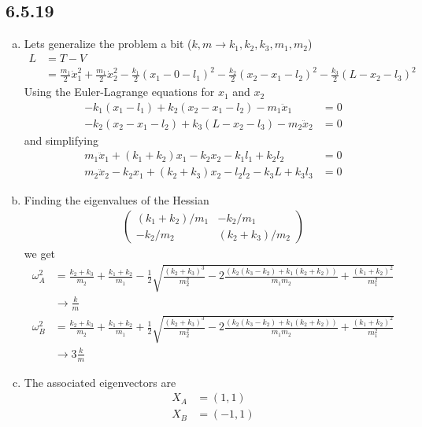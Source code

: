 \documentclass[10pt,a4paper]{book}
\theoremstyle{definition}
\begin{document}
\subsection{6.5.19}
\begin{enumerate}[(a)]
\item Lets generalize the problem a bit ($k,m \rightarrow k_1, k_2, k_3, m_1, m_2$)
\begin{align}
L&=T-V\\
&=
\frac{m_1}{2}\dot{x}_1^2
+\frac{m_1}{2}\dot{x}_2^2
-\frac{k_1}{2}(x_1-0-l_1)^2
-\frac{k_2}{2}(x_2-x_1-l_2)^2
-\frac{k_3}{2}(L-x_2-l_3)^2
\end{align}
Using the Euler-Lagrange equations for $x_1$ and $x_2$
\begin{align}
-k_1(x_1-l_1)+k_2(x_2-x_1-l_2)-m_1\ddot{x}_1&=0\\
-k_2(x_2-x_1-l_2)+k_3(L-x_2-l_3)-m_2\ddot{x}_2&=0
\end{align}
and simplifying
\begin{align}
m_1\ddot{x}_1+(k_1+k_2)x_1-k_2x_2-k_1l_1+k_2l_2&=0\\
m_2\ddot{x}_2-k_2x_1+(k_2+k_3)x_2-l_2l_2-k_3L+k_3l_3&=0
\end{align}
\item Finding the eigenvalues of the Hessian
\begin{align}
\left(\begin{array}{cc}
(k_1+k_2)/m_1 & -k_2/m_1\\
-k_2/m_2 & (k_2+k_3)/m_2
\end{array}\right)
\end{align}
we get
\begin{align}
\omega_A^2&=\frac{k_2+k_3}{m_2}+\frac{k_1+k_2}{m_1}-\frac{1}{2}\sqrt{\frac{(k_2+k_3)^3}{m_2^2}-2\frac{(k_2(k_3-k_2)+k_1(k_2+k_2))}{m_1m_2}+\frac{(k_1+k_2)^2}{m_1^2}}\\
&\rightarrow\frac{k}{m}\\
\omega_B^2&=\frac{k_2+k_3}{m_2}+\frac{k_1+k_2}{m_1}+\frac{1}{2}\sqrt{\frac{(k_2+k_3)^3}{m_2^2}-2\frac{(k_2(k_3-k_2)+k_1(k_2+k_2))}{m_1m_2}+\frac{(k_1+k_2)^2}{m_1^2}}\\
&\rightarrow3\frac{k}{m}
\end{align}

\item The associated eigenvectors are
\begin{align}
X_A&=(1,1)\\
X_B&=(-1,1)
\end{align}

\end{enumerate}
\end{document}
